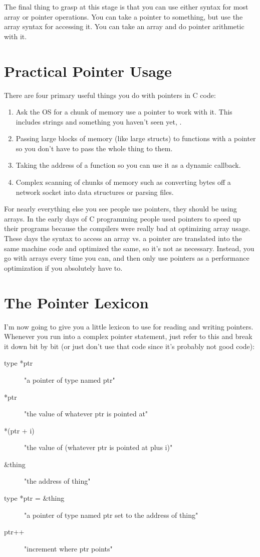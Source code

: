 The final thing to grasp at this stage is that you can use either syntax
for most array or pointer operations.  You can take a pointer to something,
but use the array syntax for accessing it.  You can take an array and do
pointer arithmetic with it. 

\section{Practical Pointer Usage}

There are four primary useful things you do with pointers in C code:

\begin{enumerate}
\item Ask the OS for a chunk of memory use a pointer
    to work with it.  This includes strings and something you haven't seen
    yet, .
\item Passing large blocks of memory (like large structs) to functions
    with a pointer so you don't have to pass the whole thing to them.
\item Taking the address of a function so you can use it as a dynamic callback.
\item Complex scanning of chunks of memory such as converting bytes off a network
    socket into data structures or parsing files.
\end{enumerate}

For nearly everything else you see people use pointers, they should be using
arrays.  In the early days of C programming people used pointers to speed
up their programs because the compilers were really bad at optimizing array 
usage.  These days the syntax to access an array vs. a pointer are translated
into the same machine code and optimized the same, so it's not as necessary.
Instead, you go with arrays every time you can, and then only use pointers
as a performance optimization if you absolutely have to.


\section{The Pointer Lexicon}

I'm now going to give you a little lexicon to use for reading and writing
pointers.  Whenever you run into a complex pointer statement, just refer
to this and break it down bit by bit (or just don't use that code since it's
probably not good code):

\begin{description}
\item[type *ptr] "a pointer of type named ptr"
\item[*ptr] "the value of whatever ptr is pointed at"
\item[*(ptr + i)] "the value of (whatever ptr is pointed at plus i)"
\item[\&thing] "the address of thing"
\item[type *ptr = \&thing] "a pointer of type named ptr set to the address of thing"
\item[ptr++] "increment where ptr points"
\end{description}

